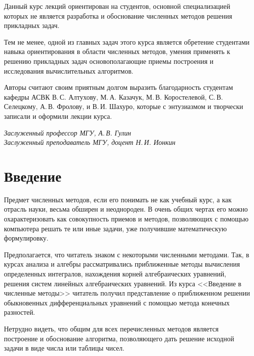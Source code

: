 \documentclass[11pt,a4paper,twoside]{report}
\numberwithin{equation}{section}
\theoremstyle{definition}
\theoremstyle{plain}
\begin{document}
Данный курс лекций ориентирован на студентов, основной специализацией которых
не является разработка и обоснование численных методов решения прикладных
задач.

Тем не менее, одной из главных задач этого курса является обретение
студентами навыка ориентирования в области численных методов, умения применять
к решению прикладных задач основополагающие приемы построения и исследования
вычислительных алгоритмов.

Авторы считают своим приятным долгом выразить благодарность студентам кафедры
АСВК В.\,С. Алтухову, М.\,А. Казачук, М.\,В. Коростелевой, С.\,В. Селецкому,
А.\,В. Фролову, и В.\,И. Шахуро, которые с энтузиазмом и творчески записали
и оформили лекции курса.

\begin{flushright}
    \textit{Заслуженный профессор МГУ, А.\,В. Гулин}\\
    \textit{Заслуженный преподаватель МГУ, доцент Н.\,И. Ионкин}\\
\end{flushright}

%
\newpage
{}
\pagestyle{empty}
%
\chapter*{Введение}
%
\vspace{0.5cm}
Предмет численных методов, если его понимать не как учебный курс, а как отрасль
науки, весьма обширен и неоднороден. В очень общих чертах его можно
охарактеризовать как совокупность приемов и методов, позволяющих с помощью
компьютера решать те или иные задачи, уже получившие математическую
формулировку.

Предполагается, что читатель знаком с некоторыми численными методами. Так,
в курсах анализа и алгебры рассматривались приближенные методы вычисления
определенных интегралов, нахождения корней алгебраических уравнений, решения
систем линейных алгебраических уравнений. Из курса <<Введение в численные
методы>> читатель получил представление о приближенном решении обыкновенных
дифференциальных уравнений с помощью метода конечных разностей.

Нетрудно видеть, что общим для всех перечисленных методов является построение и
обоснование алгоритма, позволяющего дать решение исходной задачи в виде числа
или таблицы чисел.
\end{document}
